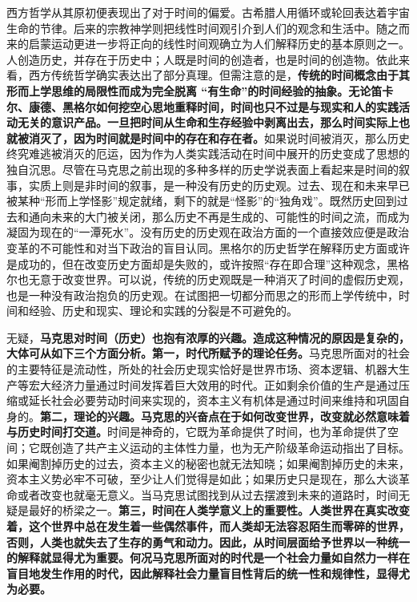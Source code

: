 \documentclass[UTF8, fontset = sourcesans, a4paper, oneside, zihao =
-4, scheme=chinese, no-math, space=true]{ctexbook}
\begin{document}
西方哲学从其原初便表现出了对于时间的偏爱。古希腊人用循环或轮回表达着宇宙生命的节律。后来的宗教神学则把线性时间观引介到人们的观念和生活中。随之而来的启蒙运动更进一步将正向的线性时间观确立为人们解释历史的基本原则之一。人创造历史，并存在于历史中；人既是时间的创造者，也是时间的创造物。依此来看，西方传统哲学确实表达出了部分真理。但需注意的是，\textbf{传统的时间概念由于其形而上学思维的局限性而成为完全脱离
``有生命''的时间经验的抽象。无论笛卡尔、康德、黑格尔如何挖空心思地重释时间，时间也只不过是与现实和人的实践活动无关的意识产品。一旦把时间从生命和生存经验中剥离出去，那么时间实际上也就被消灭了，因为时间就是时间中的存在和存在者。}如果说时间被消灭，那么历史终究难逃被消灭的厄运，因为作为人类实践活动在时间中展开的历史变成了思想的独自沉思。尽管在马克思之前出现的多种多样的历史学说表面上看起来是时间的叙事，实质上则是非时间的叙事，是一种没有历史的历史观。过去、现在和未来早已被某种``形而上学怪影''规定就绪，剩下的就是``怪影''的``独角戏''。既然历史回到过去和通向未来的大门被关闭，那么历史不再是生成的、可能性的时间之流，而成为凝固为现在的``一潭死水''。没有历史的历史观在政治方面的一个直接效应便是政治变革的不可能性和对当下政治的盲目认同。黑格尔的历史哲学在解释历史方面或许是成功的，但在改变历史方面却是失败的，或许按照``存在即合理''这种观念，黑格尔也无意于改变世界。可以说，传统的历史观既是一种消灭了时间的虚假历史观，也是一种没有政治抱负的历史观。在试图把一切都分而思之的形而上学传统中，时间和经验、历史和现实、理论和实践的分裂是不可避免的。

无疑，\textbf{马克思对时间（历史）也抱有浓厚的兴趣。造成这种情况的原因是复杂的，大体可从如下三个方面分析。第一，时代所赋予的理论任务。}马克思所面对的社会的主要特征是流动性，所处的社会历史现实恰好是世界市场、资本逻辑、机器大生产等宏大经济力量通过时间发挥着巨大效用的时代。正如剩余价值的生产是通过压缩或延长社会必要劳动时间来实现的，资本主义有机体是通过时间来维持和巩固自身的。\textbf{第二，理论的兴趣。马克思的兴奋点在于如何改变世界，改变就必然意味着与历史时间打交道。}时间是神奇的，它既为革命提供了时间，也为革命提供了空间；它既创造了共产主义运动的主体性力量，也为无产阶级革命运动指出了目标。如果阉割掉历史的过去，资本主义的秘密也就无法知晓；如果阉割掉历史的未来，资本主义势必牢不可破，至少让人们觉得是如此；如果历史只是现在，那么大谈革命或者改变也就毫无意义。当马克思试图找到从过去摆渡到未来的道路时，时间无疑是最好的桥梁之一。\textbf{第三，时间在人类学意义上的重要性。人类世界在真实改变着，这个世界中总在发生着一些偶然事件，而人类却无法容忍陌生而零碎的世界，否则，人类也就失去了生存的勇气和动力。因此，从时间层面给予世界以一种统一的解释就显得尤为重要。何况马克思所面对的时代是一个社会力量如自然力一样在盲目地发生作用的时代，因此解释社会力量盲目性背后的统一性和规律性，显得尤为必要。}
\end{document}
